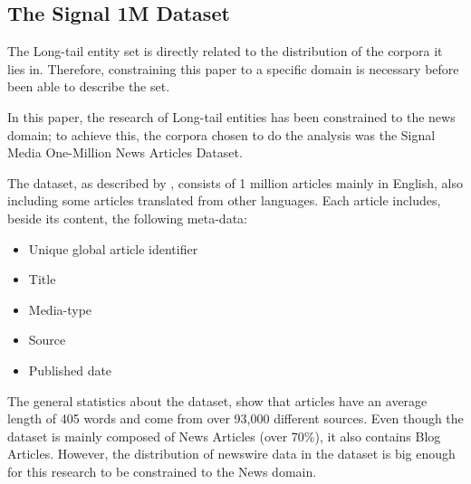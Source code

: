 \subsection{The Signal 1M Dataset}
The Long-tail entity set is directly related to the distribution of the corpora it lies in.
Therefore, constraining this paper to a specific domain is necessary before been able to describe the set.

In this paper, the research of Long-tail entities has been constrained to the news domain;
to achieve this, the corpora chosen to do the analysis was the Signal Media One-Million News Articles Dataset\cite{Signal1M2016}.

The dataset, as described by \cite{Signal1M2016}, consists of 1 million articles mainly in English,
also including some articles translated from other languages.
Each article includes, beside its content, the following meta-data:
\begin{itemize}
  \item Unique global article identifier
  \item Title
  \item Media-type
  \item Source
  \item Published date
\end{itemize}

The general statistics about the dataset, show that articles have an average length of 405 words and come from over 93,000 different sources.
Even though the dataset is mainly composed of News Articles (over 70\%), it also contains Blog Articles\cite{Signal1M2016}.
However, the distribution of newswire data in the dataset is big enough for this research to be constrained to the News domain.
